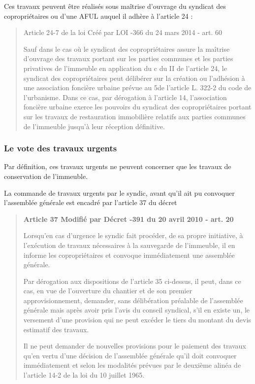 				Ces travaux peuvent être réalisés sous maîtrise d’ouvrage du syndicat des copropriétaires ou d’une AFUL auquel il adhère à l’article 24 :
				\begin{quote}
					Article 24-7 de la loi Créé par LOI -366 du 24 mars 2014 - art. 60
					
					Sauf dans le cas où le syndicat des copropriétaires assure la maîtrise d'ouvrage des travaux portant sur les parties communes et les parties privatives de l'immeuble en application du c du II de l'article 24, le syndicat des copropriétaires peut délibérer sur la création ou l'adhésion à une association foncière urbaine prévue au 5\degres de l'article L. 322-2 du code de l'urbanisme. Dans ce cas, par dérogation à l'article 14, l'association foncière urbaine exerce les pouvoirs du syndicat des copropriétaires portant sur les travaux de restauration immobilière relatifs aux parties communes de l'immeuble jusqu'à leur réception définitive.
				\end{quote}
		
		\subsubsection{Le vote des travaux urgents}
		
			Par définition, ces travaux urgents ne peuvent concerner que les travaux de conservation de l’immeuble.
			
			La commande de travaux urgents par le syndic, avant qu’il ait pu convoquer l’assemblée générale est encadré par l’article 37 du décret
			\begin{quote}
				{\bfseries Article 37 Modifié par Décret -391 du 20 avril 2010 - art. 20}

				Lorsqu’en cas d’urgence le syndic fait procéder, de sa propre initiative, à l’exécution de travaux nécessaires à la sauvegarde de l’immeuble, il en informe les copropriétaires et convoque immédiatement une assemblée générale.
				
				Par dérogation aux dispositions de l’article 35 ci-dessus, il peut, dans ce cas, en vue de l’ouverture du chantier et de son premier approvisionnement, demander, sans délibération préalable de l’assemblée générale mais après avoir pris l’avis du conseil syndical, s’il en existe un, le versement d’une provision qui ne peut excéder le tiers du montant du devis estimatif des travaux.
				
				Il ne peut demander de nouvelles provisions pour le paiement des travaux qu’en vertu d’une décision de l’assemblée générale qu’il doit convoquer immédiatement et selon les modalités prévues par le deuxième alinéa de l’article 14-2 de la loi du 10 juillet 1965.
			\end{quote}
			
